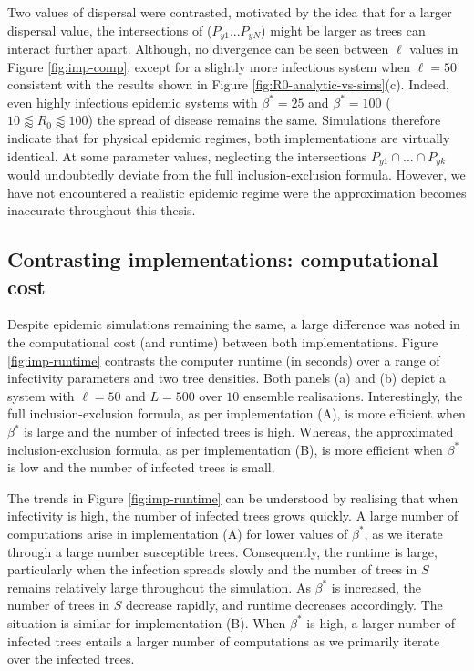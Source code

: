Two values of dispersal were contrasted, motivated by the idea that for a larger dispersal value, the intersections of ($P_{y1}...P_{yN}$) might be larger as trees can interact further apart.
Although, no divergence can be seen between $\ell$ values in Figure \ref{fig:imp-comp}, except for a slightly more infectious system when $\ell=50$\textemdash consistent with the results shown in Figure \ref{fig:R0-analytic-vs-sims}(c).
Indeed, even highly infectious epidemic systems with $\beta^*=25$ and $\beta^*=100$ ($10 \lessapprox R_0 \lessapprox 100$) the spread of disease remains the same. 
Simulations therefore indicate that for physical epidemic regimes, both implementations are virtually identical. 
At some parameter values, neglecting the intersections $P_{y1} \cap ... \cap P_{yk}$ would undoubtedly deviate from the full inclusion-exclusion formula. 
However, we have not encountered a realistic epidemic regime were the approximation becomes inaccurate 
throughout this thesis.

\subsection{Contrasting implementations: computational cost}

Despite epidemic simulations remaining the same, a large difference was noted in the computational cost (and runtime) between both implementations.
Figure \ref{fig:imp-runtime} contrasts the computer runtime (in seconds) over a range of infectivity parameters and two tree densities.
Both panels (a) and (b) depict a system with $\ell=50$ and $L=500$ over $10$ ensemble realisations. 
Interestingly, the full inclusion-exclusion formula, as per implementation (A), is more efficient when $\beta^*$ is large and the number of infected trees is high.
Whereas, the approximated inclusion-exclusion formula, as per implementation (B), is more efficient when $\beta^*$ is low and the number of infected trees is small.

The trends in Figure \ref{fig:imp-runtime} can be understood by realising that when infectivity is high, the number of infected trees grows quickly. 
A large number of computations arise in implementation (A) for lower values of $\beta^*$, as we iterate through a large number susceptible trees.
Consequently, the runtime is large, particularly when the infection spreads slowly and the number of trees in $S$ remains relatively large throughout the simulation.
As $\beta^*$ is increased, the number of trees in $S$ decrease rapidly, and runtime decreases accordingly. 
The situation is similar for implementation (B). 
When $\beta^*$ is high, a larger number of infected trees entails a larger number of computations as we primarily iterate over the infected trees.

